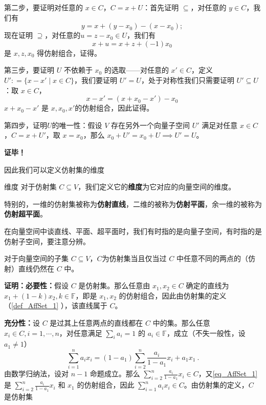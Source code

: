 第二步，要证明对任意的 $x \in C$，$C = x + U$：首先证明 $\subseteq$，对任意的 $y \in C$，我们有
\begin{equation}
y = x + (y - x_0) - (x - x_0); ~
\end{equation}
现在证明 $\supseteq$，对任意的$u  = z - x_0 \in U$，我们有
\begin{equation}
x + u = x + z + (-1) x_0 ~
\end{equation}
是 $x, z, x_0$ 得仿射组合，证得。

第三步，要证明 $U$ 不依赖于 $x_0$ 的选取——对任意的 $x' \in C$，定义 $U': = \{x - x' \mid x \in C\}$，我们要证明 $U' = U$，处于对称性我们只需要证明 $U' \subseteq U$：取 $x \in C$，
\begin{equation}
x - x' = (x + x_0 - x') - x_0 ~
\end{equation}
$x + x_0 - x'$ 是 $x, x_0, x'$的仿射组合，因此证得。

第四步，证明$U$的唯一性：假设 $V$ 存在另外一个向量子空间 $U'$ 满足对任意 $x \in C$，$C = x + U'$，取 $x = x_0$，那么 $x_0 + U' = x_0 + U \implies U' = U$。

\textbf{证毕！}

因此我们可以定义仿射集的维度
\begin{definition}{维度}
对于仿射集 $C \subseteq V$，我们定义它的\textbf{维度}为它对应的向量空间的维度。

特别的，一维的仿射集被称为\textbf{仿射直线}，二维的被称为\textbf{仿射平面}，余一维的被称为\textbf{仿射超平面}。
\end{definition}

在向量空间中谈直线、平面、超平面时，我们有时指的是向量子空间，有时指的是仿射子空间，要注意分辨。

\begin{theorem}{}\label{the_AffSet_1}
对于向量空间的子集 $C \subseteq V$，$C$为仿射集当且仅当过 $C$ 中任意不同的两点的（仿射）直线仍然在 $C$ 中。
\end{theorem}

\textbf{证明：}\textbf{必要性：}假设 $C$ 是仿射集。那么任意由 $x_1,x_2\in C$ 确定的直线为 $x_1+(1-k)x_2,k\in\mathbb F$，即是 $x_1,x_2$ 的仿射组合，因此由仿射集的定义（\autoref{def_AffSet_1} ），该直线属于 $C$。

\textbf{充分性：}设 $C$ 是过其上任意两点的直线都在 $C$ 中的集。那么任意 $x_i\in C,i=1,\cdots ,n$，对任意满足 $\sum_{i}a_i=1$ 的 $a_i\in\mathbb F$，成立（不失一般性，设 $a_1\neq1$）
\begin{equation}\label{eq_AffSet_1}
\sum_{i=1}^n a_ix_i=(1-a_1)\sum_{i=2}^n \frac{a_i}{1-a_1}x_i+a_1x_1~.
\end{equation}
由数学归纳法，设对 $n-1$ 命题成立。那么 $\sum_{i=2}^n \frac{a_i}{1-a_1}x_i\in C$，又\autoref{eq_AffSet_1} 是 $\sum_{i=2}^n \frac{a_i}{1-a_1}x_i$ 和 $x_1$ 的仿射组合，因此 $\sum_{i=1}^n a_ix_i\in C$。由仿射集的定义，$C$ 是仿射集

